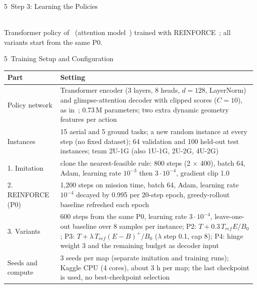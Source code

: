 \documentclass[aspectratio=169,10pt]{beamer}
\begin{document}
\begin{frame}{5 \,Step 3: Learning the Policies}
\centering
{}\\[2mm]
{\small Transformer policy of~\cite{base} (attention model~\cite{kool}) trained with REINFORCE~\cite{williams}; all variants start from the same P0.}
\end{frame}

\begin{frame}{5 \,Training Setup and Configuration}
\centering\scriptsize
\renewcommand{\arraystretch}{1.3}
\begin{tabular}{@{}P{2.6cm}P{10.0cm}@{}}
\toprule
\textbf{Part} & \textbf{Setting}\\
\midrule
Policy network & Transformer encoder (3 layers, 8 heads, $d=128$, LayerNorm) and glimpse-attention decoder with clipped scores ($C=10$), as in~\cite{base}; 0.73\,M parameters; two extra dynamic geometry features per action\\
Instances & 15 aerial and 5 ground tasks; a new random instance at every step (no fixed dataset); 64 validation and 100 held-out test instances; team 2U-1G (also 1U-1G, 2U-2G, 4U-2G)\\
1. Imitation & clone the nearest-feasible rule: 800 steps (2 $\times$ 400), batch 64, Adam, learning rate $10^{-3}$ then $3\cdot10^{-4}$, gradient clip 1.0\\
2. REINFORCE (P0) & 1{,}200 steps on mission time, batch 64, Adam, learning rate $10^{-4}$ decayed by 0.995 per 20-step epoch, greedy-rollout baseline refreshed each epoch~\cite{williams}\\
3. Variants & 600 steps from the same P0, learning rate $3\cdot10^{-4}$, leave-one-out baseline over 8 samples per instance; P2: $T+0.3\,T_{ref}E/B_0$; P3: $T+\lambda\,T_{ref}(E-B)^+/B_0$ ($\lambda$ step 0.1, cap 8); P4: hinge weight 3 and the remaining budget as decoder input\\
Seeds and compute & 3 seeds per map (separate imitation and training runs); Kaggle CPU (4 cores), about 3 h per map; the last checkpoint is used, no best-checkpoint selection\\
\bottomrule
\end{tabular}
\end{frame}
\end{document}
